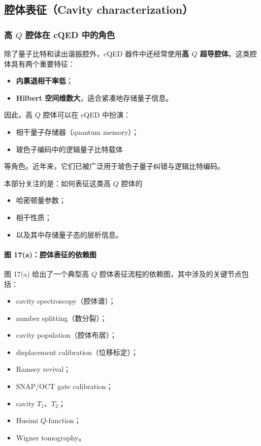 \documentclass[12pt,a4paper,oneside]{ctexbook}
\begin{document}
\subsection{腔体表征（Cavity characterization）}

\subsubsection{高 \(Q\) 腔体在 cQED 中的角色}

除了量子比特和读出谐振腔外，cQED 器件中还经常使用\textbf{高 \(Q\) 超导腔体}。这类腔体具有两个重要特征：
\begin{itemize}
    \item \textbf{内禀退相干率低}；
    \item \textbf{Hilbert 空间维数大}，适合紧凑地存储量子信息。
\end{itemize}

因此，高 \(Q\) 腔体可以在 cQED 中扮演：
\begin{itemize}
    \item 相干量子存储器（quantum memory）；
    \item 玻色子编码中的逻辑量子比特载体
\end{itemize}
等角色。近年来，它们已被广泛用于玻色子量子纠错与逻辑比特编码。

本部分关注的是：如何表征这类高 \(Q\) 腔体的
\begin{itemize}
    \item 哈密顿量参数；
    \item 相干性质；
    \item 以及其中存储量子态的层析信息。
\end{itemize}

\paragraph{图 17(a)：腔体表征的依赖图}
图 17(a) 给出了一个典型高 \(Q\) 腔体表征流程的依赖图，其中涉及的关键节点包括：
\begin{itemize}
    \item cavity spectroscopy（腔体谱）；
    \item number splitting（数分裂）；
    \item cavity population（腔体布居）；
    \item displacement calibration（位移标定）；
    \item Ramsey revival；
    \item SNAP/OCT gate calibration；
    \item cavity \(T_1\)、\(T_2\)；
    \item Husimi \(Q\)-function；
    \item Wigner tomography。
\end{itemize}
\end{document}
